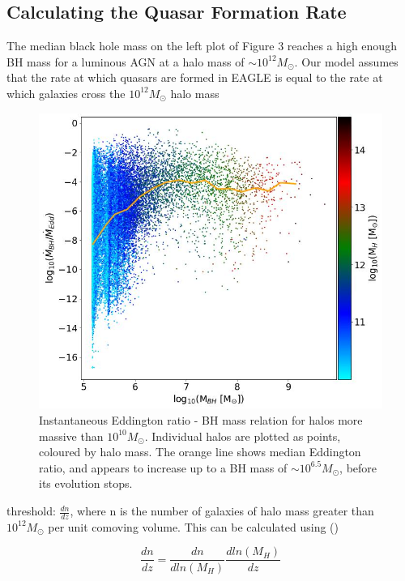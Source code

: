 \documentclass[12pt, twocolumn]{report}%
\begin{document}
 \subsection{Calculating the Quasar Formation Rate}

The median black hole mass on the left plot of Figure 3 reaches a high enough BH mass for a luminous AGN at a halo mass of $\sim10^{12}M_\odot$. Our model assumes that the rate at which quasars are formed in EAGLE is equal to the rate at which galaxies cross the $10^{12}M_\odot$ halo mass

\begin{figure}[H]
\centering
\includegraphics[width=\linewidth]{Plot_12.jpeg}
\caption{Instantaneous Eddington ratio - BH mass relation for halos more massive than $10^{10}M_\odot$. Individual halos are plotted as points, coloured by halo mass. The orange line shows median Eddington ratio, and appears to increase up to a BH mass of $\sim10^{6.5}M_\odot$, before its evolution stops.}
\label{fig:4}
\end{figure}

\noindent threshold: $\frac{dn}{dz}$, where n is the number of galaxies of halo mass greater than $10^{12}M_\odot$ per unit comoving volume. This can be calculated using (\cite{Correa})

\begin{equation}
    \frac{dn}{dz}=\frac{dn}{dln(M_H)}\frac{dln(M_H)}{dz}
\end{equation}
\end{document}
